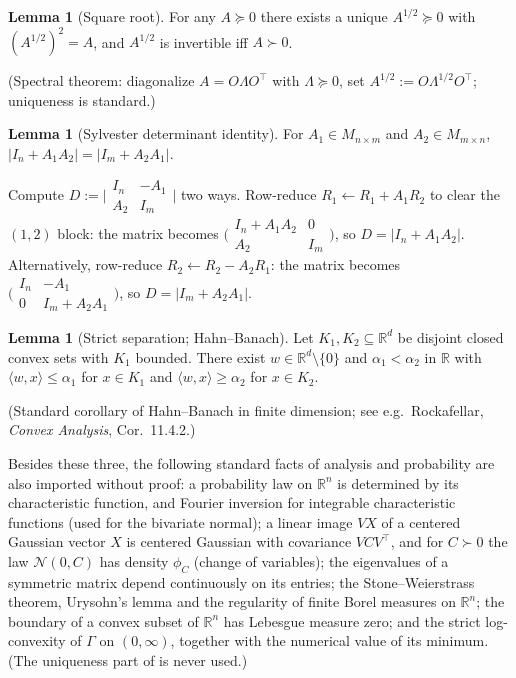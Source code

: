 \documentclass[12pt,a4paper]{article}
\makeatletter
\theoremstyle{definition}
\newtheorem{lemma}[theorem]{Lemma}
\renewenvironment{proof}[1][\proofname]{\par
  \pushQED{\qed}%
  \normalfont \topsep6\p@\@plus6\p@\relax
  \trivlist
  \item[\hskip\labelsep\bfseries #1\@addpunct{.}]\ignorespaces
}{%
  \popQED\endtrivlist\@endpefalse
}
\newcommand{\R}{\mathbb{R}}
\newcommand{\caln}{\mathcal{N}}
\makeatother
\begin{document}
\begin{lemma}[Square root]\label{lem:sqrt}
  For any $A\succcurlyeq 0$ there exists a unique $A^{1/2}\succcurlyeq 0$ with
  $(A^{1/2})^2=A$, and $A^{1/2}$ is invertible iff $A\succ 0$.
\end{lemma}

(Spectral theorem: diagonalize $A=O\Lambda O^\top$ with $\Lambda\succcurlyeq 0$,
set $A^{1/2}:=O\Lambda^{1/2}O^\top$; uniqueness is standard.)

\begin{lemma}[Sylvester determinant identity]\label{lem:sylvester}
  For $A_1\in M_{n\times m}$ and $A_2\in M_{m\times n}$,
  $|I_n+A_1A_2|=|I_m+A_2A_1|$.
\end{lemma}

\begin{proof}
  Compute $D:=\bigl|\begin{smallmatrix}I_n & -A_1\\ A_2 &
  I_m\end{smallmatrix}\bigr|$ two ways.  Row-reduce $R_1\leftarrow
  R_1+A_1R_2$ to clear the $(1,2)$ block: the matrix becomes
  $\bigl(\begin{smallmatrix}I_n+A_1A_2 & 0\\ A_2 & I_m\end{smallmatrix}\bigr)$,
  so $D=|I_n+A_1A_2|$.  Alternatively, row-reduce $R_2\leftarrow
  R_2-A_2R_1$: the matrix becomes
  $\bigl(\begin{smallmatrix}I_n & -A_1\\ 0 & I_m+A_2A_1\end{smallmatrix}\bigr)$,
  so $D=|I_m+A_2A_1|$.
\end{proof}

\begin{lemma}[Strict separation; Hahn--Banach]\label{lem:separation}
  Let $K_1,K_2\subseteq\R^d$ be disjoint closed convex sets with $K_1$
  bounded.  There exist $w\in\R^d\setminus\{0\}$ and $\alpha_1<\alpha_2$
  in $\R$ with $\langle w,x\rangle\leqslant\alpha_1$ for $x\in K_1$ and
  $\langle w,x\rangle\geqslant\alpha_2$ for $x\in K_2$.
\end{lemma}

(Standard corollary of Hahn--Banach in finite dimension; see e.g.\
Rockafellar, \emph{Convex Analysis}, Cor.\ 11.4.2.)

Besides these three, the following standard facts of analysis and
probability are also imported without proof: a probability law on $\R^n$
is determined by its characteristic function, and Fourier inversion for
integrable characteristic functions (used for the bivariate normal); a
linear image $VX$ of a centered Gaussian vector $X$ is centered Gaussian
with covariance $VCV^\top$, and for $C\succ 0$ the law $\caln(0,C)$ has
density $\phi_C$ (change of variables); the eigenvalues of a symmetric
matrix depend continuously on its entries; the Stone--Weierstrass
theorem, Urysohn's lemma and the regularity of finite Borel measures on
$\R^n$; the boundary of a convex subset of $\R^n$ has Lebesgue measure
zero; and the strict log-convexity of $\Gamma$ on $(0,\infty)$, together
with the numerical value of its minimum.  (The uniqueness part of
\Cref{lem:sqrt} is never used.)
\end{document}
